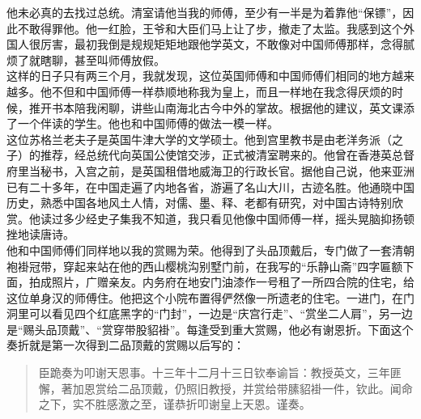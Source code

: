 他未必真的去找过总统。清室请他当我的师傅，至少有一半是为着靠他“保镖”，因此不敢得罪他。他一红脸，王爷和大臣们马上让了步，撤走了太监。我感到这个外国人很厉害，最初我倒是规规矩矩地跟他学英文，不敢像对中国师傅那样，念得腻烦了就瞎聊，甚至叫师傅放假。\\

这样的日子只有两三个月，我就发现，这位英国师傅和中国师傅们相同的地方越来越多。他不但和中国师傅一样恭顺地称我为皇上，而且一样地在我念得厌烦的时候，推开书本陪我闲聊，讲些山南海北古今中外的掌故。根据他的建议，英文课添了一个伴读的学生。他也和中国师傅的做法一模一样。\\

这位苏格兰老夫子是英国牛津大学的文学硕士。他到宫里教书是由老洋务派（之子）的推荐，经总统代向英国公使馆交涉，正式被清室聘来的。他曾在香港英总督府里当秘书，入宫之前，是英国租借地威海卫的行政长官。据他自己说，他来亚洲已有二十多年，在中国走遍了内地各省，游遍了名山大川，古迹名胜。他通晓中国历史，熟悉中国各地风土人情，对儒、墨、释、老都有研究，对中国古诗特别欣赏。他读过多少经史子集我不知道，我只看见他像中国师傅一样，摇头晃脑抑扬顿挫地读唐诗。\\

他和中国师傅们同样地以我的赏赐为荣。他得到了头品顶戴后，专门做了一套清朝袍褂冠带，穿起来站在他的西山樱桃沟别墅门前，在我写的“乐静山斋”四字匾额下面，拍成照片，广赠亲友。内务府在地安门油漆作一号租了一所四合院的住宅，给这位单身汉的师傅住。他把这个小院布置得俨然像一所遗老的住宅。一进门，在门洞里可以看见四个红底黑字的“门封”，一边是“庆宫行走”、“赏坐二人肩”，另一边是“赐头品顶戴”、“赏穿带股貂褂”。每逢受到重大赏赐，他必有谢恩折。下面这个奏折就是第一次得到二品顶戴的赏赐以后写的：\\

\begin{quote}
	臣跪奏为叩谢天恩事。十三年十二月十三日钦奉谕旨：教授英文，三年匪懈，著加恩赏给二品顶戴，仍照旧教授，并赏给带膆貂褂一件，钦此。闻命之下，实不胜感激之至，谨恭折叩谢皇上天恩。谨奏。\\
\end{quote}

